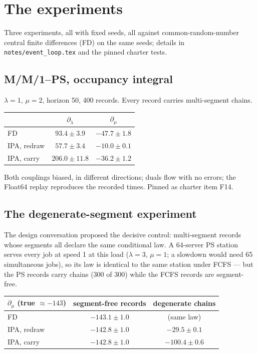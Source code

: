 \documentclass[11pt]{article}
\newcommand{\code}[1]{\texttt{#1}}
\begin{document}
\section{The experiments}

Three experiments, all with fixed seeds, all against common-random-number
central finite differences (FD) on the same seeds; details in
\code{notes/event\_loop.tex} and the pinned charter tests.

\subsection{M/M/1--PS, occupancy integral}

$\lambda = 1$, $\mu = 2$, horizon 50, 400 records. Every record carries
multi-segment chains.

\begin{center}
\small
\begin{tabular}{@{}lcc@{}}
\toprule
 & $\partial_\lambda$ & $\partial_\mu$ \\
\midrule
FD & $93.4 \pm 3.9$ & $-47.7 \pm 1.8$ \\
IPA, redraw & $57.7 \pm 3.4$ & $-10.0 \pm 0.1$ \\
IPA, carry & $206.0 \pm 11.8$ & $-36.2 \pm 1.2$ \\
\bottomrule
\end{tabular}
\end{center}

Both couplings biased, in different directions; duals flow with no
errors; the Float64 replay reproduces the recorded times. Pinned as
charter item F14.

\subsection{The degenerate-segment experiment}

The design conversation proposed the decisive control: multi-segment
records whose segments all declare the same conditional law. A
64-server PS station serves every job at speed 1 at this load
($\lambda = 3$, $\mu = 1$; a slowdown would need 65 simultaneous jobs),
so its law is identical to the same station under FCFS --- but the PS
records carry chains (300 of 300) while the FCFS records are
segment-free.

\begin{center}
\small
\begin{tabular}{@{}lcc@{}}
\toprule
$\partial_\mu$ (true $\approx -143$) & segment-free records & degenerate chains \\
\midrule
FD & $-143.1 \pm 1.0$ & (same law) \\
IPA, redraw & $-142.8 \pm 1.0$ & $-29.5 \pm 0.1$ \\
IPA, carry & $-142.8 \pm 1.0$ & $-100.4 \pm 0.6$ \\
\bottomrule
\end{tabular}
\end{center}
\end{document}
